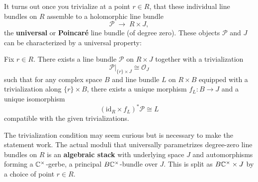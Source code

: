 \documentclass[12pt]{article}
\begin{document}
It turns out once you trivialize at a point $r \in R$, that these individual line bundles on $R$
assemble to a holomorphic line bundle
\[
\mathcal P \;\to\; R \times J,
\]
the \textbf{universal} or \textbf{Poincaré} line bundle (of degree zero). These objects $\mathcal P$ and $J$ can be characterized by a universal property:

\begin{proposition}
Fix $r\in R$. There exists a line bundle $\mathcal P$ on $R\times J$
together with a trivialization
\[
\mathcal P|_{\{r\}\times J} \cong \mathcal O_J
\]
such that for any complex space $B$ and line bundle $L$ on $R\times B$
equipped with a trivialization along $\{r\}\times B$, there exists a unique
morphism $f_L:B\to J$ and a unique isomorphism
\[
(\mathrm{id}_R\times f_L)^*\mathcal P \cong L
\]
compatible with the given trivializations.
\end{proposition}

\begin{remark}
The trivialization condition may seem curious but is necessary to make the statement work.
The actual moduli that universally parametrizes degree-zero line bundles on $R$
is an \textbf{algebraic stack} with underlying space $J$
and automorphisms forming a $\mathbb{C}^\times$-gerbe,
a principal $B\mathbb{C}^\times$-bundle over $J$.
This is split as $B\mathbb{C}^\times \times J$ by a choice of point $r \in R$.
\end{remark}
\end{document}
